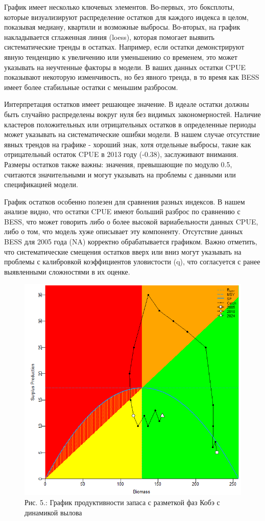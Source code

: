 \documentclass[
  letterpaper,
  DIV=11,
  numbers=noendperiod]{scrreprt}
\begin{document}
График имеет несколько ключевых элементов. Во-первых, это боксплоты,
которые визуализируют распределение остатков для каждого индекса в
целом, показывая медиану, квартили и возможные выбросы. Во-вторых, на
график накладывается сглаженная линия (loess), которая помогает выявить
систематические тренды в остатках. Например, если остатки демонстрируют
явную тенденцию к увеличению или уменьшению со временем, это может
указывать на неучтенные факторы в модели. В ваших данных остатки CPUE
показывают некоторую изменчивость, но без явного тренда, в то время как
BESS имеет более стабильные остатки с меньшим разбросом.

Интерпретация остатков имеет решающее значение. В идеале остатки должны
быть случайно распределены вокруг нуля без видимых закономерностей.
Наличие кластеров положительных или отрицательных остатков в
определенные периоды может указывать на систематические ошибки модели. В
нашем случае отсутствие явных трендов на графике - хороший знак, хотя
отдельные выбросы, такие как отрицательный остаток CPUE в 2013 году
(-0.38), заслуживают внимания. Размеры остатков также важны: значения,
превышающие по модулю 0.5, считаются значительными и могут указывать на
проблемы с данными или спецификацией модели.

График остатков особенно полезен для сравнения разных индексов. В нашем
анализе видно, что остатки CPUE имеют больший разброс по сравнению с
BESS, что может говорить либо о более высокой вариабельности данных
CPUE, либо о том, что модель хуже описывает эту компоненту. Отсутствие
данных BESS для 2005 года (NA) корректно обрабатывается графиком. Важно
отметить, что систематические смещения остатков вверх или вниз могут
указывать на проблемы с калибровкой коэффициентов уловистости (q), что
согласуется с ранее выявленными сложностями в их оценке.

\begin{figure}[H]

{\centering \includegraphics[width=0.6\linewidth,height=\textheight,keepaspectratio]{images/JABBA5.PNG}

}

\caption{Рис. 5.: График продуктивности запаса с разметкой фаз Кобэ с
динамикой вылова}

\end{figure}%
\end{document}
